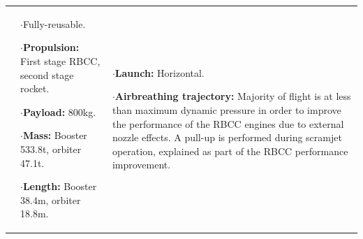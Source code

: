 {\begin{landscape}
\begin{xltabular}{\linewidth}{|X|X|X|}
	&\small
	
	$\cdot$Fully-reusable. 
	
	$\cdot$\textbf{Propulsion:} First stage RBCC, second stage rocket. 
	
	$\cdot$\textbf{Payload:} 800kg.

	 $\cdot$\textbf{Mass:} Booster 533.8t, orbiter 47.1t.
	 
	 $\cdot$\textbf{Length:} Booster 38.4m, orbiter 18.8m. 
	 
	
	&\small
	
	$\cdot$\textbf{Launch:} Horizontal. 
	
	$\cdot$\textbf{Airbreathing trajectory:} Majority of flight is at less than maximum dynamic pressure in order to improve the performance of the RBCC engines due to external nozzle effects. A pull-up is performed during scramjet operation, explained as part of the RBCC performance improvement.


\end{xltabular}
\end{landscape}}
